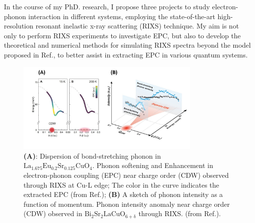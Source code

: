 \documentclass[11pt]{article}
\begin{document}
In the course of my PhD. research, I propose three projects to study electron-phonon interaction in different systems, employing the state-of-the-art high-resolution resonant inelastic x-ray scattering (RIXS) technique\cite{ament_resonant_2011,zhou_i21_2022}. 
My aim is not only to perform RIXS experiments to investigate EPC, but also to develop the theoretical and numerical methods for simulating RIXS spectra beyond the model proposed in Ref.\cite{ament_determining_2011}, to better assist in extracting EPC in various quantum systems.
\begin{figure}[!t]
    \centering
    \includegraphics[width=0.8\textwidth]{figures/new_first_figure.jpg}
    \caption{\textbf{(A)}: Dispersion of bond-stretching phonon in $\mathrm{La_{1.675}Eu_{0.2}Sr_{0.125}CuO_{4}}$. Phonon softening and Enhancement in electron-phonon coupling (EPC) near charge order (CDW) observed through RIXS at Cu-L edge; The color in the curve indicates the extracted EPC (from Ref.\cite{wang_charge_2021}); \textbf{(B)} A sketch of phonon intensity as a function of momentum. Phonon intensity anomaly near charge order (CDW) observed in $\mathrm{Bi_2Sr_2LaCuO_{6+\delta}}$ through RIXS.  (from Ref.\cite{li_multiorbital_2020}).}  
    \label{first_figure}
\end{figure}
\end{document}
